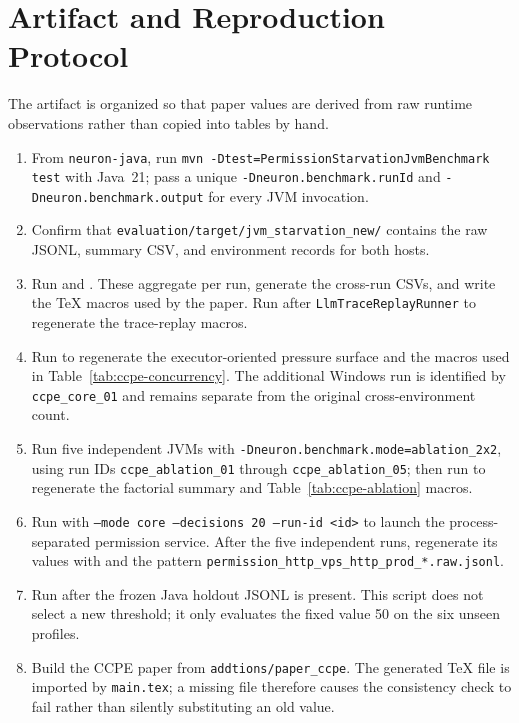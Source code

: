 \appendix
\section{Artifact and Reproduction Protocol}
\label{sec:artifact}

The artifact is organized so that paper values are derived from raw runtime
observations rather than copied into tables by hand.

\begin{enumerate}
  \item From \texttt{neuron-java}, run
  \texttt{mvn -Dtest=PermissionStarvationJvmBenchmark test} with Java~21;
  pass a unique \texttt{-Dneuron.benchmark.runId} and
  \texttt{-Dneuron.benchmark.output} for every JVM invocation.
  \item Confirm that
  \texttt{evaluation/target/jvm\_starvation\_new/} contains the raw JSONL,
  summary CSV, and environment records for both hosts.
  \item Run  and
  . These aggregate per
  run, generate the cross-run CSVs, and write the TeX macros used by the
  paper. Run  after
  \texttt{LlmTraceReplayRunner} to regenerate the trace-replay macros.
  \item Run  to
  regenerate the executor-oriented pressure surface and the macros used in
  Table~\ref{tab:ccpe-concurrency}. The additional Windows run is identified
  by \texttt{ccpe\_core\_01} and remains separate from the original
  cross-environment count.
  \item Run five independent JVMs with
  \texttt{-Dneuron.benchmark.mode=ablation\_2x2}, using run IDs
  \texttt{ccpe\_ablation\_01} through \texttt{ccpe\_ablation\_05}; then run
   to regenerate the
  factorial summary and Table~\ref{tab:ccpe-ablation} macros.
  \item Run 
  with \texttt{--mode core --decisions 20 --run-id <id>} to launch the
  process-separated permission service. After the five independent runs,
  regenerate its values with
   and the pattern
  \texttt{permission\_http\_vps\_http\_prod\_*.raw.jsonl}.
  \item Run  after
  the frozen Java holdout JSONL is present. This script does not select a new
  threshold; it only evaluates the fixed value 50 on the six unseen profiles.
  \item Build the CCPE paper from \texttt{addtions/paper\_ccpe}. The generated TeX file
  is imported by \texttt{main.tex}; a missing file therefore causes the
  consistency check to fail rather than silently substituting an old value.
\end{enumerate}

